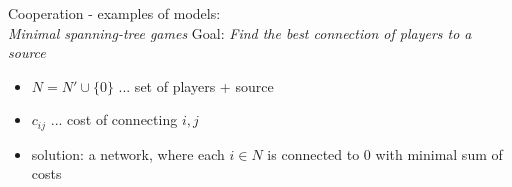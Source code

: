 \documentclass{beamer}
\begin{document}

\begin{frame}{Cooperation - examples of models:\\ \textit{Minimal spanning-tree games}}
	Goal: \textit{Find the best connection of players to a source}
	\begin{itemize}
		\item<2-> $N = N' \cup \{0\}$ ... set of players + source
		\item<3-> $c_{ij}$ ... cost of connecting $i,j$
		\item<4-> solution: a network, where each $i \in N$ is connected to $0$ with minimal sum of costs
	\end{itemize}
	
\end{frame}

\end{document}
